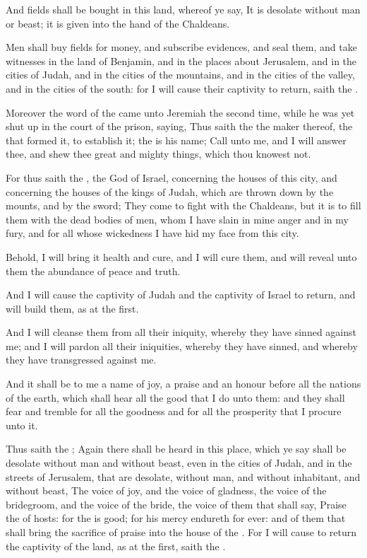 \Verse And fields shall be bought in this land, whereof ye say, It is desolate without man or beast; it is given into the hand of the Chaldeans.

\Verse Men shall buy fields for money, and subscribe evidences, and seal them, and take witnesses in the land of Benjamin, and in the places about Jerusalem, and in the cities of Judah, and in the cities of the mountains, and in the cities of the valley, and in the cities of the south: for I will cause their captivity to return, saith the \LORD.


\Chapter
\Verse Moreover the word of the \LORD came unto Jeremiah the second time, while he was yet shut up in the court of the prison, saying, \Verse Thus saith the \LORD the maker thereof, the \LORD that formed it, to establish it; the \LORD is his name; \Verse Call unto me, and I will answer thee, and shew thee great and mighty things, which thou knowest not.

\Verse For thus saith the \LORD, the God of Israel, concerning the houses of this city, and concerning the houses of the kings of Judah, which are thrown down by the mounts, and by the sword; \Verse They come to fight with the Chaldeans, but it is to fill them with the dead bodies of men, whom I have slain in mine anger and in my fury, and for all whose wickedness I have hid my face from this city.

\Verse Behold, I will bring it health and cure, and I will cure them, and will reveal unto them the abundance of peace and truth.

\Verse And I will cause the captivity of Judah and the captivity of Israel to return, and will build them, as at the first.

\Verse And I will cleanse them from all their iniquity, whereby they have sinned against me; and I will pardon all their iniquities, whereby they have sinned, and whereby they have transgressed against me.

\Verse And it shall be to me a name of joy, a praise and an honour before all the nations of the earth, which shall hear all the good that I do unto them: and they shall fear and tremble for all the goodness and for all the prosperity that I procure unto it.

\Verse Thus saith the \LORD; Again there shall be heard in this place, which ye say shall be desolate without man and without beast, even in the cities of Judah, and in the streets of Jerusalem, that are desolate, without man, and without inhabitant, and without beast, \Verse The voice of joy, and the voice of gladness, the voice of the bridegroom, and the voice of the bride, the voice of them that shall say, Praise the \LORD of hosts: for the \LORD is good; for his mercy endureth for ever: and of them that shall bring the sacrifice of praise into the house of the \LORD. For I will cause to return the captivity of the land, as at the first, saith the \LORD.

